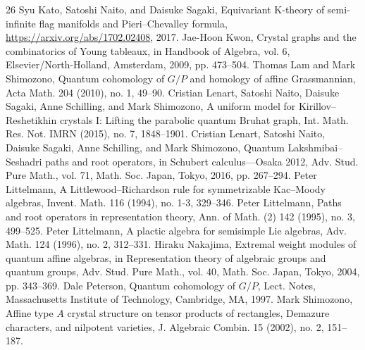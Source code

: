 \documentclass[10pt]{amsart}
\theoremstyle{definition}\newtheorem{defi}[theo]{Definition}
\theoremstyle{remark}\newtheorem{rema}[theo]{Remark}
\begin{document}
\begin{thebibliography}{26}
 Syu Kato, Satoshi Naito, and Daisuke Sagaki, Equivariant K-theory of semi-infinite flag manifolds and Pieri--Chevalley formula, \url{https://arxiv.org/abs/1702.02408}, 2017.
 Jae-Hoon Kwon, Crystal graphs and the combinatorics of Young tableaux, in Handbook of Algebra, vol. 6, Elsevier/North-Holland, Amsterdam, 2009, pp. 473--504.
 Thomas Lam and Mark Shimozono, Quantum cohomology of $G/P$ and homology of affine Grassmannian, Acta Math. 204 (2010), no. 1, 49--90.
 Cristian Lenart, Satoshi Naito, Daisuke Sagaki, Anne Schilling, and Mark Shimozono, A uniform model for Kirillov--Reshetikhin crystals I: Lifting the parabolic quantum Bruhat graph, Int. Math. Res. Not. IMRN (2015), no. 7, 1848--1901.
 Cristian Lenart, Satoshi Naito, Daisuke Sagaki, Anne Schilling, and Mark Shimozono, Quantum Lakshmibai--Seshadri paths and root operators, in Schubert calculus---Osaka 2012, Adv. Stud. Pure Math., vol. 71, Math. Soc. Japan, Tokyo, 2016, pp. 267--294.
 Peter Littelmann, A Littlewood--Richardson rule for symmetrizable Kac--Moody algebras, Invent. Math. 116 (1994), no. 1-3, 329--346.
 Peter Littelmann, Paths and root operators in representation theory, Ann. of Math. (2) 142 (1995), no. 3, 499--525.
 Peter Littelmann, A plactic algebra for semisimple Lie algebras, Adv. Math. 124 (1996), no. 2, 312--331.
 Hiraku Nakajima, Extremal weight modules of quantum affine algebras, in Representation theory of algebraic groups and quantum groups, Adv. Stud. Pure Math., vol. 40, Math. Soc. Japan, Tokyo, 2004, pp. 343--369.
 Dale Peterson, Quantum cohomology of $G/P$, Lect. Notes, Massachusetts Institute of Technology, Cambridge, MA, 1997.
 Mark Shimozono, Affine type $A$ crystal structure on tensor products of rectangles, Demazure characters, and nilpotent varieties, J. Algebraic Combin. 15 (2002), no. 2, 151--187.
\end{thebibliography}
\end{document}
